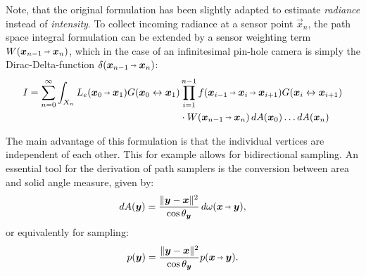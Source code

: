 Note, that the original formulation has been slightly adapted to estimate \emph{radiance} instead of \emph{intensity}.
To collect incoming radiance at a sensor point $\vec{x}_n$, the path space integral formulation can be extended by a sensor weighting term $W(\pdir{n-1}{n})$, which in the case of an infinitesimal pin-hole camera is simply the Dirac-Delta-function $\delta(\pdir{n-1}{n})$:
\begin{equation}
\label{eq:path_space_integral_sensor}
\begin{aligned}
    I
    = \sum_{n=0}^{\infty} \int_{X_n} L_e(\pdir{0}{1}) \G{0}{1} &\prod_{i=1}^{n - 1} \f{i-1}{i}{i+1} \G{i}{i+1}\\
    &\cdot W(\pdir{n-1}{n}) \diff A(\vec{x}_0) \dots \diff A(\vec{x}_n)
\end{aligned}
\end{equation}

The main advantage of this formulation is that the individual vertices are independent of each other.
This for example allows for bidirectional sampling.
An essential tool for the derivation of path samplers is the conversion between area and solid angle measure, given by:
\begin{equation}
\label{eq:area_solid_angle}
\diff A(\vec{y}) = \frac{\|\vec{y} - \vec{x}\|^2}{\cos \theta_{\vec{y}}} \diff \omega(\vec{x}\pto\vec{y}),
\end{equation}
or equivalently for sampling:
\begin{equation}
\label{eq:area_solid_angle_p}
p(\vec{y}) = \frac{\|\vec{y} - \vec{x}\|^2}{\cos \theta_{\vec{y}}} p(\vec{x}\pto\vec{y}).
\end{equation}


